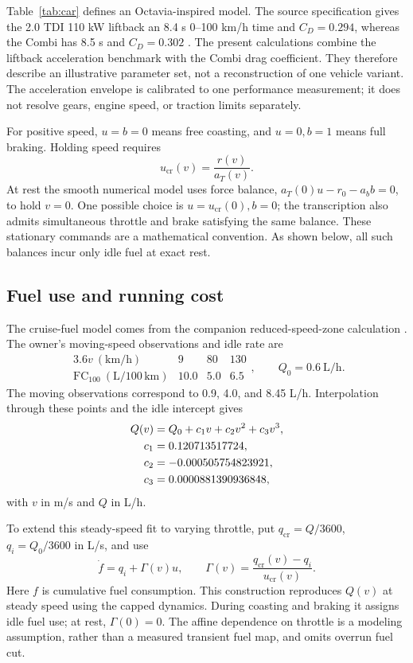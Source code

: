 \documentclass[journal,a4paper,twocolumn]{IEEEtran}
\newcommand{\cruise}{\mathrm{cr}}
\begin{document}
Table~\ref{tab:car} defines an Octavia-inspired model. The source specification gives the 2.0 TDI 110 kW liftback an 8.4 s 0--100 km/h time and $C_D=0.294$, whereas the Combi has 8.5 s and $C_D=0.302$ \cite{skoda}. The present calculations combine the liftback acceleration benchmark with the Combi drag coefficient. They therefore describe an illustrative parameter set, not a reconstruction of one vehicle variant. The acceleration envelope is calibrated to one performance measurement; it does not resolve gears, engine speed, or traction limits separately.

For positive speed, $u=b=0$ means free coasting, and $u=0,b=1$ means full braking. Holding speed requires
\begin{equation}
 u_{\cruise}(v)=\frac{r(v)}{a_T(v)}.
 \label{eq:ucr}
\end{equation}
At rest the smooth numerical model uses force balance, $a_T(0)u-r_0-a_bb=0$, to hold $v=0$. One possible choice is $u=u_{\cruise}(0),b=0$; the transcription also admits simultaneous throttle and brake satisfying the same balance. These stationary commands are a mathematical convention. As shown below, all such balances incur only idle fuel at exact rest.

\subsection{Fuel use and running cost}
The cruise-fuel model comes from the companion reduced-speed-zone calculation \cite{companion}. The owner's moving-speed observations and idle rate are
\begin{equation}
\begin{array}{c|ccc}
3.6v\ (\mathrm{km/h})&9&80&130\\ \hline
\mathrm{FC}_{100}\ (\mathrm{L/100\,km})&10.0&5.0&6.5
\end{array},\qquad Q_0=0.6\ \mathrm{L/h}.
\label{eq:obs}
\end{equation}
The moving observations correspond to 0.9, 4.0, and 8.45 L/h. Interpolation through these points and the idle intercept gives
\begin{align}
 Q(v)&=Q_0+c_1v+c_2v^2+c_3v^3,\label{eq:Q}\\
 c_1&=0.120713517724,\notag\\
 c_2&=-0.000505754823921,\notag\\
 c_3&=0.0000881390936848,\notag
\end{align}
with $v$ in m/s and $Q$ in L/h.

To extend this steady-speed fit to varying throttle, put $q_{\cruise}=Q/3600$, $q_i=Q_0/3600$ in L/s, and use
\begin{equation}
 \dot f=q_i+\Gamma(v)u,\qquad
 \Gamma(v)=\frac{q_{\cruise}(v)-q_i}{u_{\cruise}(v)}.
 \label{eq:fuel}
\end{equation}
Here $f$ is cumulative fuel consumption. This construction reproduces $Q(v)$ at steady speed using the capped dynamics. During coasting and braking it assigns idle fuel use; at rest, $\Gamma(0)=0$. The affine dependence on throttle is a modeling assumption, rather than a measured transient fuel map, and omits overrun fuel cut.
\end{document}

